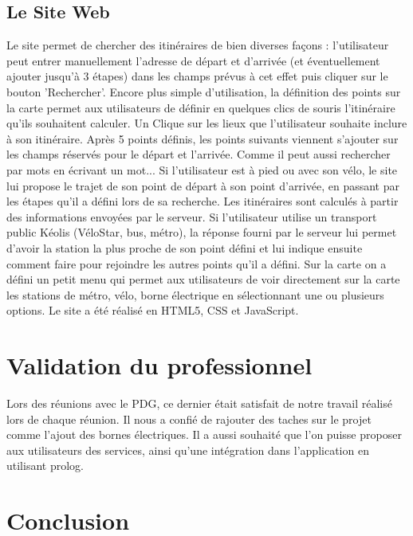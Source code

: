 \documentclass[twocolumn]{article}   		%
\begin{document}
	\subsection{Le Site Web}
	Le site permet de chercher des itin\'eraires de bien diverses fa\c cons : l'utilisateur peut entrer manuellement l'adresse de d\'epart et d'arriv\'ee (et \'eventuellement ajouter jusqu'\`a 3 \'etapes) dans les champs pr\'evus \`a cet effet puis cliquer sur le bouton 'Rechercher'. Encore plus simple d'utilisation, la d\'efinition des points sur la carte permet aux utilisateurs de d\'efinir en quelques clics de souris l'itin\'eraire qu'ils souhaitent calculer. Un Clique sur les lieux que l'utilisateur souhaite inclure \`a son itin\'eraire. Apr\`es 5 points d\'efinis, les points suivants viennent s'ajouter sur les champs r\'eserv\'es pour le d\'epart et l'arriv\'ee. Comme il peut aussi rechercher par mots en \'ecrivant un mot... Si l'utilisateur est \`a pied ou avec son v\'elo, le site lui propose le trajet de son point de d\'epart \`a son point d'arriv\'ee, en passant par les \'etapes qu'il a d\'efini lors de sa recherche. Les itin\'eraires sont calcul\'es \`a partir des informations envoy\'ees par le serveur. Si l'utilisateur utilise un transport public K\'eolis (V\'eloStar, bus, m\'etro), la r\'eponse fourni par le serveur lui permet d'avoir la station la plus proche de son point d\'efini et lui indique ensuite comment faire pour rejoindre les autres points qu'il a d\'efini. Sur la carte on a d\'efini un petit menu qui permet aux utilisateurs de voir directement sur la carte les stations de m\'etro, v\'elo, borne \'electrique en s\'electionnant une ou plusieurs options. Le site a \'et\'e r\'ealis\'e en HTML5, CSS et JavaScript.

\section{Validation du professionnel}
Lors des r\'eunions avec le PDG, ce dernier \'etait satisfait de notre travail r\'ealis\'e lors de chaque r\'eunion. Il nous a confi\'e de rajouter des taches sur le projet comme l'ajout des bornes \'electriques. Il a aussi souhait\'e que l'on puisse proposer aux utilisateurs des services, ainsi qu'une int\'egration dans l'application en utilisant prolog.

\section{Conclusion}
\end{document}
